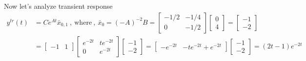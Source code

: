 \documentclass[twoside]{article}
\begin{document}
Now let's analyze transient response
\begin{align*} 
y^{tr}(t) &= C e^{A t} \bar{x}_{0,1} \ , \ \mathrm{where} \ , \  \bar{x}_0 = \left(-A \right)^{-2} B = \begin{bmatrix} -1/2 & -1/4 \\ 0 & -1/2 \end{bmatrix}  \begin{bmatrix} 0 \\ 4 \end{bmatrix} = \begin{bmatrix} -1 \\ -2 \end{bmatrix} 
\\
&= \begin{bmatrix} -1 & 1 \end{bmatrix} \begin{bmatrix} e^{-2 t} & t e^{-2 t} \\ 0 &e^{-2 t} \end{bmatrix} \begin{bmatrix} -1 \\ -2 \end{bmatrix} 
= \begin{bmatrix} -e^{-2 t} & -t e^{-2 t} + e^{-2 t} \end{bmatrix} \begin{bmatrix} -1 \\ -2 \end{bmatrix}  
= (2 t - 1) e^{-2 t} 
\end{align*}



\end{document}
